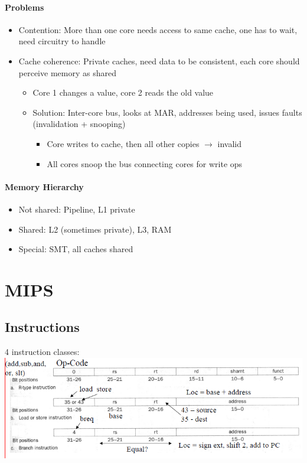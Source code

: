 \documentclass[12 pt]{article}
\begin{document}
\paragraph{Problems}
\begin{itemize}
\item  Contention: More than one core needs access to same cache, one has to wait, need circuitry to handle
\item Cache coherence: Private caches, need data to be consistent, each core should perceive memory as shared
\begin{itemize}
\item Core 1 changes a value, core 2 reads the old value
\item Solution: Inter-core bus, looks at MAR, addresses being used, issues faults (invalidation + snooping)
\begin{itemize}
\item Core writes to cache, then all other copies $\to$ invalid
\item All cores snoop the bus connecting cores for write ops
\end{itemize}
\end{itemize}
\end{itemize}

\paragraph{Memory Hierarchy}
\begin{itemize}
\item Not shared: Pipeline, L1 private
\item Shared: L2 (sometimes private), L3, RAM
\item Special: SMT, all caches shared
\end{itemize}
	\section{MIPS}
	\subsection{Instructions}
	4 instruction classes:
	\\ \includegraphics[scale=0.7]{4ins}
\end{document}

